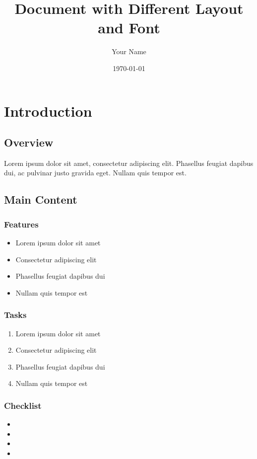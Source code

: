 \documentclass{article}
\begin{document}
\title{Document with Different Layout and Font}
\author{Your Name}
\date{\today}
\maketitle

\section{Introduction}
\subsection{Overview}
Lorem ipsum dolor sit amet, consectetur adipiscing elit. Phasellus feugiat dapibus dui, ac pulvinar justo gravida eget. Nullam quis tempor est.

\subsection{Main Content}
\subsubsection{Features}
\begin{itemize}[label=\textbullet]
    \item Lorem ipsum dolor sit amet
    \item Consectetur adipiscing elit
    \item Phasellus feugiat dapibus dui
    \item Nullam quis tempor est
\end{itemize}

\subsubsection{Tasks}
\begin{enumerate}
    \item Lorem ipsum dolor sit amet
    \item Consectetur adipiscing elit
    \item Phasellus feugiat dapibus dui
    \item Nullam quis tempor est
\end{enumerate}

\subsubsection{Checklist}
\begin{itemize}
    \item {}
    \item  {}
    \item  {}
    \item  {}
\end{itemize}
\end{document}
